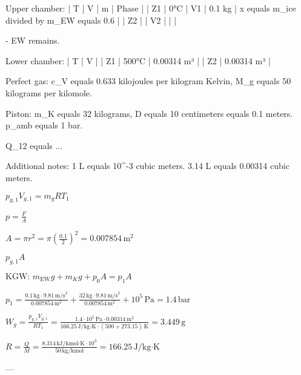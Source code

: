 Upper chamber:  
| T | V | m | Phase |  
| Z1 | 0°C | V1 | 0.1 kg | x equals m_ice divided by m_EW equals 0.6 |  
| Z2 | | V2 | | |  

- EW remains.  

Lower chamber:  
| T | V |  
| Z1 | 500°C | 0.00314 m³ |  
| Z2 | 0.00314 m³ |  

Perfect gas:  
c_V equals 0.633 kilojoules per kilogram Kelvin, M_g equals 50 kilograms per kilomole.  

Piston:  
m_K equals 32 kilograms, D equals 10 centimeters equals 0.1 meters.  
p_amb equals 1 bar.  

Q_12 equals ...  

Additional notes:  
1 L equals 10^-3 cubic meters.  
3.14 L equals 0.00314 cubic meters.

\( p_{g,1} V_{g,1} = m_g R T_1 \)  

\( p = \frac{F}{A} \)  

\( A = \pi r^2 = \pi \left(\frac{0.1}{2}\right)^2 = 0.007854 \, \text{m}^2 \)  

\( p_{g,1} A \)  

\( \text{KGW: } m_{\text{EW}} g + m_K g + p_0 A = p_1 A \)  

\( p_1 = \frac{0.1 \, \text{kg} \cdot 9.81 \, \text{m/s}^2}{0.007854 \, \text{m}^2} + \frac{32 \, \text{kg} \cdot 9.81 \, \text{m/s}^2}{0.007854 \, \text{m}^2} + 10^5 \, \text{Pa} = 1.4 \, \text{bar} \)  

\( W_g = \frac{p_{g,1} V_{g,1}}{R T_1} = \frac{1.4 \cdot 10^5 \, \text{Pa} \cdot 0.00314 \, \text{m}^3}{166.25 \, \text{J/kg·K} \cdot (500 + 273.15) \, \text{K}} = 3.449 \, \text{g} \)  

\( R = \frac{Q}{M} = \frac{8.314 \, \text{kJ/kmol·K} \cdot 10^3}{50 \, \text{kg/kmol}} = 166.25 \, \text{J/kg·K} \)  

---